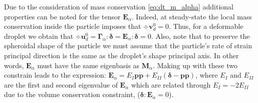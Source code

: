 Due to the consideration of mass conservation \eqref{eq:dt_m_alpha} additional properties can be noted for the tensor $\textbf{E}_\alpha$.
Indeed, at steady-state the local mass conservation inside the particle imposes that $\div \textbf{v}_d^0 = 0$. 
Thus, for a deformable droplet we obtain that $\div \textbf{u}_d^0 = \bm\Gamma_\alpha : \bm\delta = \textbf{E}_\alpha : \bm\delta =  0$.  
Also, note that to preserve the spheroidal shape of the particle we must assume that the particle's rate of strain principal direction is the same as the droplet's shape principal axis. 
In other words, $\textbf{E}_\alpha$ must have the same eigenbasis as $\textbf{M}_\alpha$. 
Making up with these two constrain leads to the expression: $\textbf{E}_\alpha = E_I \textbf{pp} + E_{II} (\bm\delta - \textbf{pp})$, where $E_I$ and $E_{II}$ are the first and second eigenvalue of $\textbf{E}_\alpha$ which are related through $E_I = - 2E_{II}$ due to the volume conservation constraint, ($\bm\delta : \textbf{E}_\alpha =0$). 


